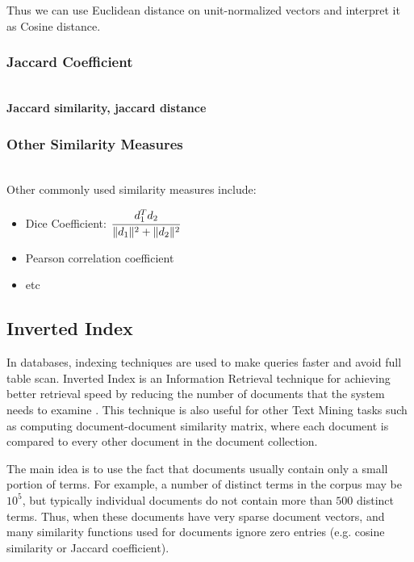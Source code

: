 Thus we can use Euclidean distance on unit-normalized vectors
and interpret it as Cosine distance.


\subsubsection{Jaccard Coefficient} \ \\

\textbf{Jaccard similarity, jaccard distance}


\subsubsection{Other Similarity Measures} \ \\


Other commonly used similarity measures include:

\begin{itemize}
  \item Dice Coefficient: $\cfrac{d_1^T d_2}{\|d_1\|^2 + \| d_2\|^2}$
  \item Pearson correlation coefficient
  \item etc
\end{itemize}


\subsection{Inverted Index} \label{sec:index}

In databases, indexing techniques are used to make queries faster and
avoid full table scan. Inverted Index is an Information Retrieval technique
for achieving better retrieval speed by reducing the number of documents that
the system needs to examine \cite{manning2008introduction}.
This technique is also
useful for other Text Mining tasks such as computing document-document
similarity matrix, where each document is compared to every other document
in the document collection.

%


The main idea is to use the fact that documents usually contain only
a small portion of terms. For example, a number of distinct terms in
the corpus may be $10^5$, but typically individual documents do not
contain more than $500$ distinct terms. %
Thus, when these documents have very sparse document vectors, and many
similarity functions used for documents ignore zero entries
(e.g. cosine similarity or Jaccard coefficient).


